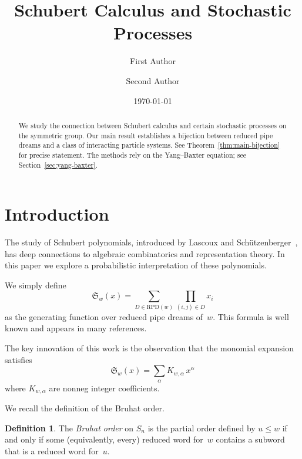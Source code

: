 \documentclass{amsart}
\theoremstyle{plain}
\theoremstyle{definition}
\newtheorem{definition}[theorem]{Definition}
\theoremstyle{remark}
\begin{document}
\title{Schubert Calculus and Stochastic Processes}
\author{First Author \and Second Author}
\date{\today}
\maketitle

\begin{abstract}
We study the connection between Schubert calculus and certain
stochastic processes on the symmetric group. Our main result establishes
a bijection between reduced pipe dreams and a class of interacting
particle systems. See Theorem~\ref{thm:main-bijection} for precise
statement. The methods rely on the Yang--Baxter equation; see
Section~\ref{sec:yang-baxter}.
\end{abstract}

\section{Introduction}
\label{sec:intro}

The study of Schubert polynomials, introduced by Lascoux and
Sch\"utzenberger~\cite{LS1982}, has deep connections to algebraic
combinatorics and representation theory.  In this paper we explore
a probabilistic interpretation of these polynomials.

We simply define
\[
\mathfrak{S}_w(x) = \sum_{D \in \mathrm{RPD}(w)} \prod_{(i,j) \in D} x_i
\]
as the generating function over reduced pipe dreams of~$w$.
This formula is well known and appears in many references.

The key innovation of this work is the observation that
the monomial expansion satisfies
\begin{equation}
\label{eq:main-expansion}
\mathfrak{S}_w(x) = \sum_{\alpha} K_{w,\alpha}\, x^\alpha
\end{equation}
where $K_{w,\alpha}$ are nonneg integer coefficients.

We recall the definition of the Bruhat order.

\begin{definition}
\label{def:bruhat}
The \emph{Bruhat order} on $S_n$ is the partial order defined by
$u \leq w$ if and only if some (equivalently, every) reduced word
for~$w$ contains a subword that is a reduced word for~$u$.
\end{definition}
\end{document}
